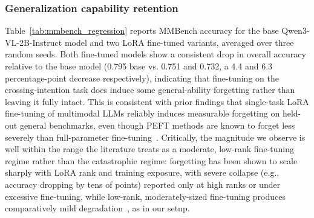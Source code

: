 \documentclass[letterpaper, 10pt, journal]{IEEEtran}  %
\begin{document}
\begin{table}[t]

\end{table}


\subsubsection{Generalization capability retention}

Table~\ref{tab:mmbench_regression} reports MMBench accuracy for the base Qwen3-VL-2B-Instruct model and two LoRA fine-tuned variants, averaged over three random seeds. Both fine-tuned models show a consistent drop in overall accuracy relative to the base model (0.795 base vs. 0.751 and 0.732, a 4.4 and 6.3 percentage-point decrease respectively), indicating that fine-tuning on the crossing-intention task does induce some general-ability forgetting rather than leaving it fully intact. This is consistent with prior findings that single-task LoRA fine-tuning of multimodal LLMs reliably induces measurable forgetting on held-out general benchmarks, even though PEFT methods are known to forget less severely than full-parameter fine-tuning~\cite{zhai2023investigating}. Critically, the magnitude we observe is well within the range the literature treats as a moderate, low-rank fine-tuning regime rather than the catastrophic regime: forgetting has been shown to scale sharply with LoRA rank and training exposure, with severe collapse (e.g., accuracy dropping by tens of points) reported only at high ranks or under excessive fine-tuning, while low-rank, moderately-sized fine-tuning produces comparatively mild degradation~\cite{liang2025lorasculpt}, as in our setup. 
\end{document}

